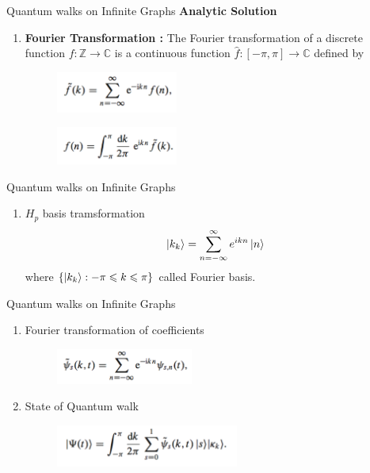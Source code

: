 \documentclass[xcolor=svgnames]{beamer}
\def\leq{\leqslant}
\begin{document}
\begin{frame}{Quantum walks on Infinite Graphs}
\textbf{Analytic Solution}
\begin{enumerate}
    \item \textbf{Fourier Transformation :} The Fourier transformation of a discrete function $ f : \mathbb{Z} \rightarrow \mathbb{C}$ is a continuous function $\hat{f}: [-\pi,\pi] \rightarrow \mathbb{C}$ defined by
    \begin{figure}
        \centering
        \includegraphics[width = 4cm]{FF.png}
    \end{figure}       
    \begin{figure}
        \centering
        \includegraphics[width = 4cm]{IF.png}
    \end{figure}
\end{enumerate}
\end{frame}

\begin{frame}{Quantum walks on Infinite Graphs}
\begin{enumerate}
    \item $H_p$ basis tramsformation $$\ket{k_k} = \sum_{n=-\infty}^{\infty} e^{ikn}\ket{n}$$
    where $\{\ket{k_k} : -\pi \leq k \leq \pi\}$ called Fourier basis.
\end{enumerate}
\end{frame}

\begin{frame}{Quantum walks on Infinite Graphs}
\begin{enumerate}
    \item Fourier transformation of coefficients
    \begin{figure}
        \centering
        \includegraphics[width = 4.5cm]{CF.png}
    \end{figure}
    \item State of Quantum walk
    \begin{figure}
        \centering
        \includegraphics[width = 6cm]{ST.png}
    \end{figure}
\end{enumerate}
\end{frame}
\end{document}

